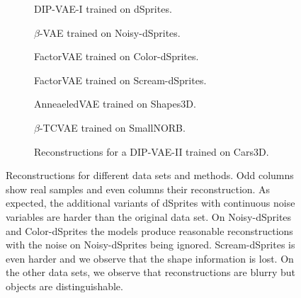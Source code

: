 \begin{figure}[p!]
  \centering
  \begin{subfigure}{0.5\textwidth}
    {}\hspace{2mm}
    \caption{DIP-VAE-I trained on dSprites.}
  \end{subfigure}%
  \begin{subfigure}{0.5\textwidth}
    {}
    \caption{$\beta$-VAE trained on Noisy-dSprites.}
  \end{subfigure}
  \begin{subfigure}{0.5\textwidth}
    {}\hspace{2mm}
    \caption{FactorVAE trained on Color-dSprites.}
  \end{subfigure}%
  \begin{subfigure}{0.5\textwidth}
    {}
    \caption{FactorVAE trained on Scream-dSprites.}
  \end{subfigure}
  \begin{subfigure}{0.5\textwidth}
    {}\hspace{2mm}
    \caption{AnneaeledVAE trained on Shapes3D.}
  \end{subfigure}%
  \begin{subfigure}{0.5\textwidth}
    {}
    \caption{$\beta$-TCVAE trained on SmallNORB.}
  \end{subfigure}
  \begin{subfigure}{0.5\textwidth}
    {}
    \caption{Reconstructions for a DIP-VAE-II trained on Cars3D.}
  \end{subfigure}
  \caption{Reconstructions for different data sets and methods. Odd columns show real samples and even columns their reconstruction. As expected, the additional variants of dSprites with continuous noise variables are harder than the original data set.
    On Noisy-dSprites and Color-dSprites the models produce reasonable reconstructions with the noise on Noisy-dSprites being ignored.
    Scream-dSprites is even harder and we observe that the shape information is lost.
    On the other data sets, we observe that reconstructions are blurry but objects are distinguishable.\label{figure:reconstructions}}
\end{figure}


